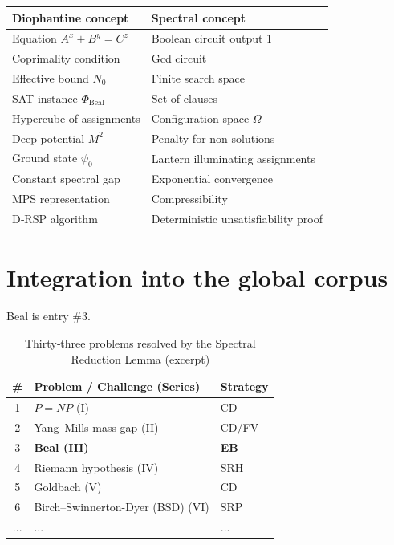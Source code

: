 \documentclass[11pt,a4paper]{article}
\begin{document}
\begin{center}
\small
\begin{tabular}{@{}l|l@{}}
\toprule
\textbf{Diophantine concept} & \textbf{Spectral concept} \\
\midrule
Equation \(A^x + B^y = C^z\) & Boolean circuit output 1 \\
Coprimality condition & Gcd circuit \\
Effective bound \(N_0\) & Finite search space \\
SAT instance \(\Phi_{\text{Beal}}\) & Set of clauses \\
Hypercube of assignments & Configuration space \(\Omega\) \\
Deep potential \(M^2\) & Penalty for non‑solutions \\
Ground state \(\psi_0\) & Lantern illuminating assignments \\
Constant spectral gap & Exponential convergence \\
MPS representation & Compressibility \\
D‑RSP algorithm & Deterministic unsatisfiability proof \\
\bottomrule
\end{tabular}
\end{center}

\section{Integration into the global corpus}

Beal is entry \#3.

\begin{center}
\small
\begin{longtable}{@{}cll@{}}
\caption{Thirty‑three problems resolved by the Spectral Reduction Lemma (excerpt)}\\
\toprule
\# & Problem / Challenge (Series) & Strategy \\
\midrule
1 & \(P = NP\) (I) & CD \\
2 & Yang–Mills mass gap (II) & CD/FV \\
3 & \textbf{Beal (III)} & \textbf{EB} \\
4 & Riemann hypothesis (IV) & SRH \\
5 & Goldbach (V) & CD \\
6 & Birch–Swinnerton-Dyer (BSD) (VI) & SRP \\
... & ... & ... \\
\bottomrule
\end{longtable}
\end{center}
\end{document}
